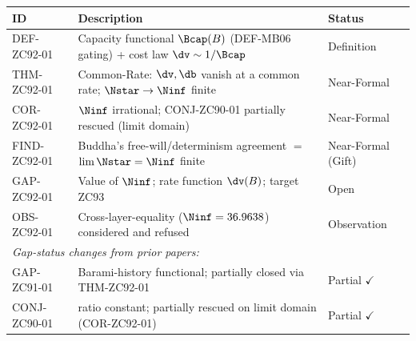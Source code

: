 \documentclass[12pt, a4paper]{article}
\begin{document}
\begin{formalbox}[title={Atomic Registry --- ZC92}]
\begin{center}
\renewcommand{\arraystretch}{1.3}
\small
\begin{tabular}{lp{8.0cm}l}
\toprule
\textbf{ID} & \textbf{Description} & \textbf{Status} \\
\midrule
DEF-ZC92-01
  & Capacity functional $\Bcap(B)$ (DEF-MB06 gating) + cost law
    $\dv\sim1/\Bcap$
  & Definition \\[3pt]
THM-ZC92-01
  & Common-Rate: $\dv,\db$ vanish at a common rate; $\Nstar\to\Ninf$
    finite
  & Near-Formal \\[3pt]
COR-ZC92-01
  & $\Ninf$ irrational; CONJ-ZC90-01 partially rescued (limit domain)
  & Near-Formal \\[3pt]
FIND-ZC92-01
  & Buddha's free-will/determinism agreement $=$ $\lim\Nstar=\Ninf$ finite
  & Near-Formal (Gift) \\[3pt]
GAP-ZC92-01
  & Value of $\Ninf$; rate function $\dv(B)$; target ZC93
  & Open \\[3pt]
OBS-ZC92-01
  & Cross-layer-equality ($\Ninf=36.9638$) considered and refused
  & Observation \\[3pt]
\midrule
\multicolumn{3}{l}{\emph{Gap-status changes from prior papers:}} \\
GAP-ZC91-01 & Barami-history functional; partially closed via THM-ZC92-01
  & Partial $\checkmark$ \\
CONJ-ZC90-01 & ratio constant; partially rescued on limit domain
  (COR-ZC92-01) & Partial $\checkmark$ \\
\bottomrule
\end{tabular}
\end{center}
\end{formalbox}

\end{document}

